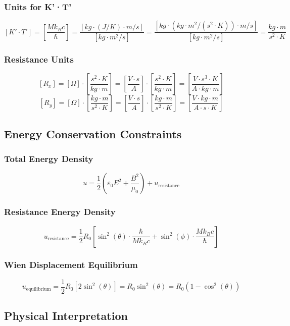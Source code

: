 ﻿\documentclass[12pt]{article}
\begin{document}
\subsubsection{Units for K'·T'}
$$[K' \cdot T'] = \left[\frac{Mk_Bc}{\hbar}\right] = \frac{[kg \cdot (J/K) \cdot m/s]}{[kg \cdot m^2/s]} = \frac{[kg \cdot (kg \cdot m^2/(s^2 \cdot K)) \cdot m/s]}{[kg \cdot m^2/s]} = \frac{kg \cdot m}{s^2 \cdot K}$$

\subsubsection{Resistance Units}
$$[R_x] = [\Omega]\cdot\left[\frac{s^2 \cdot K}{kg \cdot m}\right] = \left[\frac{V \cdot s}{A}\right]\cdot\left[\frac{s^2 \cdot K}{kg \cdot m}\right] = \left[\frac{V \cdot s^3 \cdot K}{A \cdot kg \cdot m}\right]$$
$$[R_y] = [\Omega]\cdot\left[\frac{kg \cdot m}{s^2 \cdot K}\right] = \left[\frac{V \cdot s}{A}\right]\cdot\left[\frac{kg \cdot m}{s^2 \cdot K}\right] = \left[\frac{V \cdot kg \cdot m}{A \cdot s \cdot K}\right]$$

\subsection{Energy Conservation Constraints}

\subsubsection{Total Energy Density}
$$u = \frac{1}{2}\left(\varepsilon_0 E^2 + \frac{B^2}{\mu_0}\right) + u_{\text{resistance}}$$

\subsubsection{Resistance Energy Density}
$$u_{\text{resistance}} = \frac{1}{2}R_0\left[\sin^2(\theta)\cdot\frac{\hbar}{Mk_Bc} + \sin^2(\phi)\cdot\frac{Mk_Bc}{\hbar}\right]$$

\subsubsection{Wien Displacement Equilibrium}
$$u_{\text{equilibrium}} = \frac{1}{2}R_0\left[2\sin^2(\theta)\right] = R_0\sin^2(\theta) = R_0(1 - \cos^2(\theta))$$

\subsection{Physical Interpretation}
\end{document}
